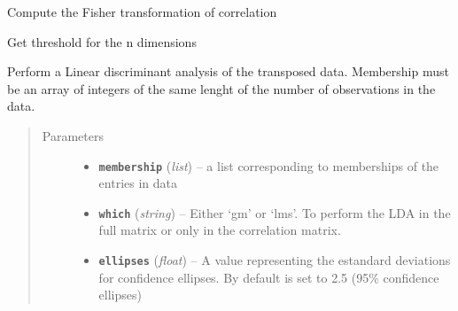 \documentclass[letterpaper,10pt,english]{sphinxmanual}
\begin{document}
\begin{fulllineitems}
\begin{fulllineitems}
\end{fulllineitems}


\begin{fulllineitems}
\label{Doc:Moduler.GMstats.F_transf}
Compute the Fisher transformation of correlation

\end{fulllineitems}


\begin{fulllineitems}
\label{Doc:Moduler.GMstats.GetAglomeratedThreshold}
Get threshold for the n dimensions

\end{fulllineitems}


\begin{fulllineitems}
\label{Doc:Moduler.GMstats.LDA}
Perform a Linear discriminant analysis of the transposed data. Membership must be an array
of integers of the same lenght of the number of observations in the data.
\begin{quote}\begin{description}
\item[{Parameters}] \leavevmode\begin{itemize}
\item {} 
\textbf{\texttt{membership}} (\emph{list}) -- a list corresponding to memberships of the entries in data

\item {} 
\textbf{\texttt{which}} (\emph{string}) -- Either `gm' or `lms'. To perform the LDA in the full matrix or only in the correlation matrix.

\item {} 
\textbf{\texttt{ellipses}} (\emph{float}) -- A value representing the estandard deviations for confidence ellipses. By default is set to 2.5 (95\% confidence ellipses)

\end{itemize}

\end{description}\end{quote}


\end{fulllineitems}
\end{fulllineitems}
\end{document}
